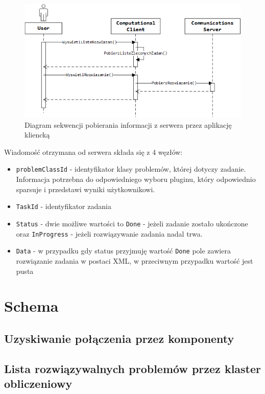 \documentclass[12pt,a4paper,titlepage]{report}
\begin{document}
	 

	\begin{figure}[h]
		\centering
		\caption{Diagram sekwencji pobierania informacji z serwera przez aplikację kliencką}
		 \includegraphics[width=\textwidth]{img/communication/getresult.png}
	\end{figure} 	
	
	Wiadomość otrzymana od serwera składa się z 4 węzłów:
	\begin{itemize}
		\item \verb+problemClassId+ - identyfikator klasy problemów, której dotyczy zadanie. Informacja potrzebna do odpowiedniego wyboru 
		pluginu, który odpowiednio sparsuje i przedstawi wyniki użytkownikowi.
		\item \verb+TaskId+ - identyfikator zadania
		\item \verb+Status+ - dwie możliwe wartości to \verb+Done+ - jeżeli zadanie zostało ukończone oraz \verb+InProgress+ - jeżeli rozwiązywanie zadania nadal trwa.
		\item \verb+Data+ - w przypadku gdy status przyjmuję wartość \verb+Done+ pole zawiera rozwiązanie zadania w postaci XML,
		w przeciwnym przypadku wartość jest pusta
	\end{itemize}
	
	\section{Schema}
		\subsection{Uzyskiwanie połączenia przez komponenty}	
			
		\subsection{Lista rozwiązywalnych problemów przez klaster obliczeniowy}
			
\end{document}
